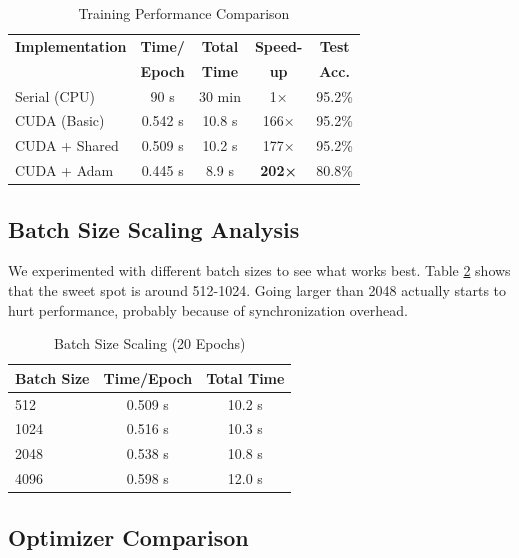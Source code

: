 \documentclass[conference]{IEEEtran}
\begin{document}
\begin{table}[htbp]
\caption{Training Performance Comparison}
\begin{center}
\begin{tabular}{lcccc}
\toprule
\textbf{Implementation} & \textbf{Time/} & \textbf{Total} & \textbf{Speed-} & \textbf{Test}\\
& \textbf{Epoch} & \textbf{Time} & \textbf{up} & \textbf{Acc.}\\
\midrule
Serial (CPU) & 90 s & 30 min & 1× & 95.2\% \\
CUDA (Basic) & 0.542 s & 10.8 s & 166× & 95.2\% \\
CUDA + Shared & 0.509 s & 10.2 s & 177× & 95.2\% \\
CUDA + Adam & 0.445 s & 8.9 s & \textbf{202×} & 80.8\% \\
\bottomrule
\end{tabular}
\label{tab:performance}
\end{center}
\end{table}

\subsection{Batch Size Scaling Analysis}

We experimented with different batch sizes to see what works best. Table \ref{tab:batchsize} shows that the sweet spot is around 512-1024. Going larger than 2048 actually starts to hurt performance, probably because of synchronization overhead.

\begin{table}[htbp]
\caption{Batch Size Scaling (20 Epochs)}
\begin{center}
\begin{tabular}{lcc}
\toprule
\textbf{Batch Size} & \textbf{Time/Epoch} & \textbf{Total Time}\\
\midrule
512 & 0.509 s & 10.2 s \\
1024 & 0.516 s & 10.3 s \\
2048 & 0.538 s & 10.8 s \\
4096 & 0.598 s & 12.0 s \\
\bottomrule
\end{tabular}
\label{tab:batchsize}
\end{center}
\end{table}

\subsection{Optimizer Comparison}
\end{document}
